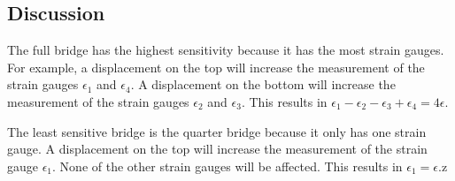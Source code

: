 \subsection{Discussion}
The full bridge has the highest sensitivity because it has the most strain gauges. For example,
a displacement on the top will increase the measurement of the strain gauges $\epsilon_1$ and $\epsilon_4$. 
A displacement on the bottom will increase the measurement of the strain gauges $\epsilon_2$ and $\epsilon_3$.
This results in $\epsilon_1 - \epsilon_2 - \epsilon_3 + \epsilon_4 = 4 \epsilon$.

The least sensitive bridge is the quarter bridge because it only has one strain gauge. A displacement on the top
will increase the measurement of the strain gauge $\epsilon_1$. None of the other strain gauges will be affected.
This results in $\epsilon_1 = \epsilon$.z